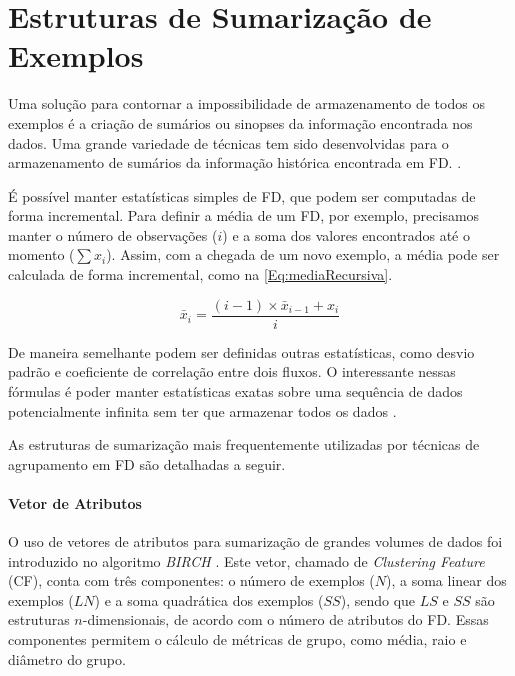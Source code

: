 \section{Estruturas de Sumarização de Exemplos} \label{chConceitos:FD:Sumario}

Uma solução para contornar a impossibilidade de armazenamento de todos os exemplos é a criação de sumários ou sinopses da informação encontrada nos dados. Uma grande variedade de técnicas tem sido desenvolvidas para o armazenamento de sumários da informação histórica encontrada em FD. \cite{gama2007}.

É possível manter estatísticas simples de FD, que podem ser computadas de forma incremental. Para definir a média de um FD, por exemplo, precisamos manter o número de observações ($i$) e a soma dos valores encontrados até o momento ($\sum x_i$). Assim, com a chegada de um novo exemplo, a média pode ser calculada de forma incremental, como na \autoref{Eq:mediaRecursiva}.

\begin{equation} \label{Eq:mediaRecursiva}
\bar{x}_{i} = \frac{(i-1) \times \bar{x}_{i-1} +  x_{i}}{i}
\end{equation}

De maneira semelhante podem ser definidas outras estatísticas, como desvio padrão e coeficiente de correlação entre dois fluxos. O interessante nessas fórmulas é poder manter estatísticas exatas sobre uma sequência de dados potencialmente infinita sem ter que armazenar todos os dados \cite{gama2007}.

As estruturas de sumarização mais frequentemente utilizadas por técnicas de agrupamento em FD são detalhadas a seguir.

\paragraph{Vetor de Atributos \\}

O uso de vetores de atributos para sumarização de grandes volumes de dados foi introduzido no algoritmo \emph{BIRCH} \cite{zhang1996}. Este vetor, chamado de \emph{Clustering Feature} (CF), conta com três componentes: o número de exemplos ($N$), a soma linear dos exemplos ($LN$) e a soma quadrática dos exemplos ($SS$), sendo que $LS$ e $SS$ são estruturas $n$-dimensionais, de acordo com o número de atributos do FD. Essas componentes permitem o cálculo de métricas de grupo, como média, raio e diâmetro do grupo. 

